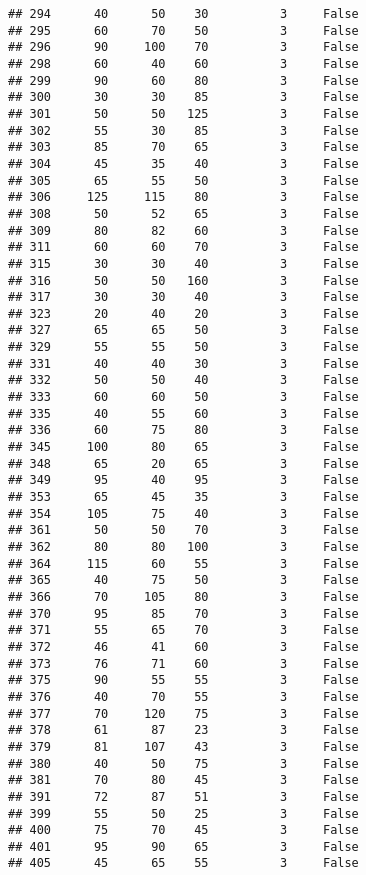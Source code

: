 \documentclass[
]{article}
\begin{document}
\begin{verbatim}
## 294      40      50    30          3     False
## 295      60      70    50          3     False
## 296      90     100    70          3     False
## 298      60      40    60          3     False
## 299      90      60    80          3     False
## 300      30      30    85          3     False
## 301      50      50   125          3     False
## 302      55      30    85          3     False
## 303      85      70    65          3     False
## 304      45      35    40          3     False
## 305      65      55    50          3     False
## 306     125     115    80          3     False
## 308      50      52    65          3     False
## 309      80      82    60          3     False
## 311      60      60    70          3     False
## 315      30      30    40          3     False
## 316      50      50   160          3     False
## 317      30      30    40          3     False
## 323      20      40    20          3     False
## 327      65      65    50          3     False
## 329      55      55    50          3     False
## 331      40      40    30          3     False
## 332      50      50    40          3     False
## 333      60      60    50          3     False
## 335      40      55    60          3     False
## 336      60      75    80          3     False
## 345     100      80    65          3     False
## 348      65      20    65          3     False
## 349      95      40    95          3     False
## 353      65      45    35          3     False
## 354     105      75    40          3     False
## 361      50      50    70          3     False
## 362      80      80   100          3     False
## 364     115      60    55          3     False
## 365      40      75    50          3     False
## 366      70     105    80          3     False
## 370      95      85    70          3     False
## 371      55      65    70          3     False
## 372      46      41    60          3     False
## 373      76      71    60          3     False
## 375      90      55    55          3     False
## 376      40      70    55          3     False
## 377      70     120    75          3     False
## 378      61      87    23          3     False
## 379      81     107    43          3     False
## 380      40      50    75          3     False
## 381      70      80    45          3     False
## 391      72      87    51          3     False
## 399      55      50    25          3     False
## 400      75      70    45          3     False
## 401      95      90    65          3     False
## 405      45      65    55          3     False

\end{verbatim}
\end{document}
